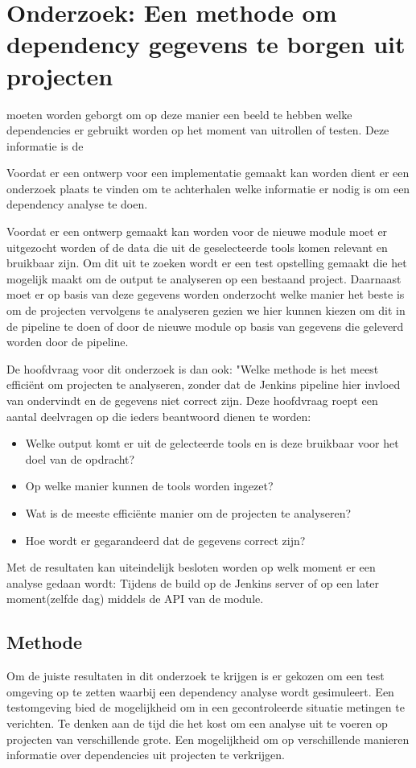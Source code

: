
\chapter{Onderzoek: Een methode om dependency gegevens te borgen uit projecten}\label{ch:onderzoek:-een-methode-om-dependency-gegevens-te-borgen-uit-projecten}


moeten  worden geborgt om op deze manier een beeld te hebben welke dependencies er gebruikt worden op het moment van uitrollen of testen. Deze informatie is de



Voordat er een ontwerp voor een implementatie gemaakt kan worden dient er een onderzoek plaats te vinden om te achterhalen welke informatie er nodig is om een dependency analyse te doen.

Voordat er een ontwerp gemaakt kan worden voor de nieuwe module moet er uitgezocht worden of de data die uit de geselecteerde tools komen relevant en bruikbaar zijn. Om dit uit te zoeken wordt er een test opstelling gemaakt die het mogelijk maakt om de output te analyseren op een bestaand project. Daarnaast moet er op basis van deze gegevens worden onderzocht welke manier het beste is om de projecten vervolgens te analyseren gezien we hier kunnen kiezen om dit in de pipeline te doen of door de nieuwe module op basis van gegevens die geleverd worden door de pipeline.


De hoofdvraag voor dit onderzoek is dan ook: "Welke methode is het meest efficiënt om projecten te analyseren, zonder dat de Jenkins pipeline hier invloed van ondervindt en de gegevens niet correct zijn. Deze hoofdvraag roept een aantal deelvragen op die ieders beantwoord dienen te worden:


\begin{itemize}
    \item Welke output komt er uit de gelecteerde tools en is deze bruikbaar voor het doel van de opdracht?
    \item Op welke manier kunnen de tools worden ingezet?
    \item Wat is de meeste efficiënte manier om de projecten te analyseren?
    \item Hoe wordt er gegarandeerd dat de gegevens correct zijn?
\end{itemize}
Met de resultaten kan uiteindelijk besloten worden op welk moment er een analyse gedaan wordt: Tijdens de build op de Jenkins server of op een later moment(zelfde dag) middels de API van de module.

\section{Methode}\label{sec:methode}
Om de juiste resultaten in dit onderzoek te krijgen is er gekozen om een test omgeving op te zetten waarbij een dependency analyse wordt gesimuleert. Een testomgeving bied de mogelijkheid om in een gecontroleerde situatie metingen te verichten. Te denken aan de tijd die het kost om een analyse uit te voeren op projecten van verschillende grote. Een mogelijkheid om op verschillende manieren informatie over dependencies uit projecten te verkrijgen.

